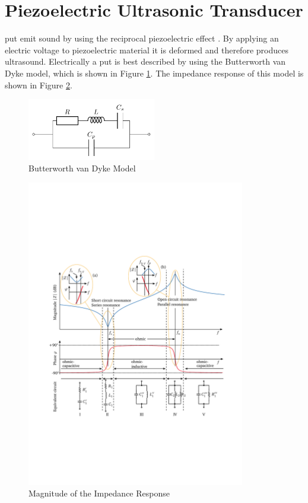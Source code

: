 \section{Piezoelectric Ultrasonic Transducer}
\acrfull{put} emit sound by using the reciprocal piezoelectric effect \cite{air_coupled_ultraonic}. By applying an electric voltage to piezoelectric material it is deformed and therefore produces ultrasound. Electrically a \acrshort{put} is best described by using the Butterworth van Dyke model, which is shown in Figure \ref{2_fig:butt_dyke_model}.
The impedance response of this model is shown in Figure \ref{2_fig:impedance_put}.
\begin{figure}[h!]
    \centering
    \includegraphics[width=0.5\textwidth]{images/2_Preliminaries/Van_Dyke_Circuit.pdf}
    \caption{Butterworth van Dyke Model}
    \label{2_fig:butt_dyke_model}
\end{figure}
\begin{figure}
    \centering
    \includegraphics[width=0.85\textwidth]{images/2_Preliminaries/Impedance_PUT.pdf}
    \caption{Magnitude of the Impedance Response \cite{air_coupled_ultraonic}}
    \label{2_fig:impedance_put}
\end{figure}


